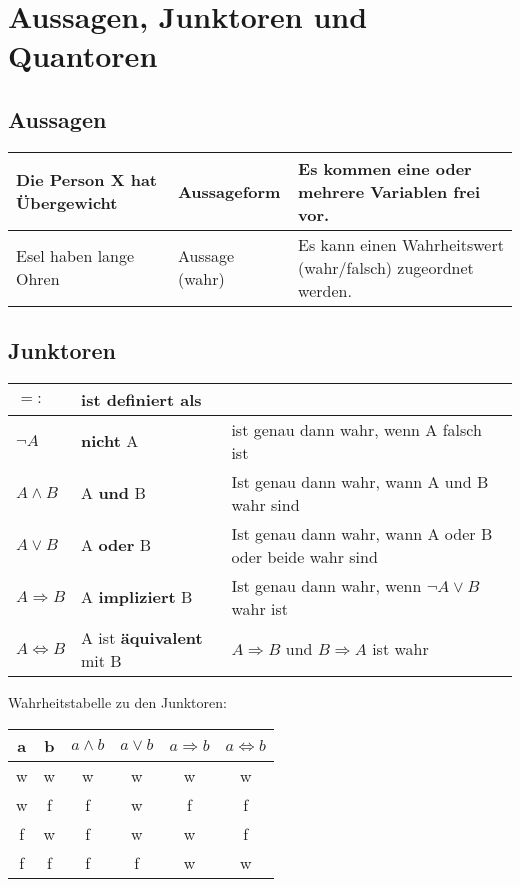 \chapter{Aussagen, Junktoren und Quantoren}
\section{Aussagen}
\begin{longtable}{|p{}|p{}|p{}|}
	\hline
	Die Person X hat Übergewicht & Aussageform & Es kommen eine oder mehrere Variablen frei vor. \\
	\hline
	Esel haben lange Ohren & Aussage (wahr) & Es kann einen Wahrheitswert (wahr/falsch) zugeordnet werden. \\
	\hline
\end{longtable}

\section{Junktoren}
\begin{longtable}{|l|l|l|}
	\hline
	\(=:\) & ist definiert als & ~ \\
	\hline
	\(\neg A\) & \textbf{nicht} A & ist genau dann wahr, wenn A falsch ist \\
	\hline
	\( A \wedge B \) & A \textbf{und} B & Ist genau dann wahr, wann A und B wahr sind \\
	\hline
	\(A \vee B \) & A \textbf{oder} B & Ist genau dann wahr, wann A oder B oder beide wahr sind \\ 
	\hline
	\( A \Rightarrow B \) & A \textbf{impliziert} B & Ist genau dann wahr, wenn \(\neg A \vee B \) wahr ist \\
	\hline
	\( A \Leftrightarrow B \) & A ist \textbf{äquivalent} mit B & \(A \Rightarrow B \) und \(B \Rightarrow A \) ist wahr \\
	\hline
\end{longtable}
Wahrheitstabelle zu den Junktoren:
\begin{longtable}{|c|c||c|c|c|c|}
	\hline
	a & b & \(a \wedge b\) & \(a \vee b\) & \(a \Rightarrow b\) & \(a \Leftrightarrow b\) \\ \hline \hline
	w & w & w & w & w & w \\ \hline
	w & f & f & w & f & f \\ \hline
	f & w & f & w & w & f \\ \hline
	f & f & f & f & w & w \\ \hline
\end{longtable}

